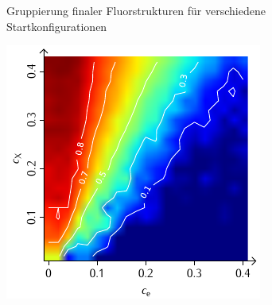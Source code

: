 \documentclass[a4paper, 10pt, twoside, openany]{book} %
\begin{document}
\begin{figure}
\begin{minipage}[t]{0.48\textwidth}
        \label{F_penalty_individual_G}
    \end{minipage}
    \caption[Gruppierung finaler Fluorstrukturen]{Gruppierung finaler Fluorstrukturen für verschiedene Startkonfigurationen}
    \label{F_G}
\end{figure}

\begin{figure}
    \begin{minipage}[t]{0.48\textwidth}
        \includegraphics[width=\textwidth]{Abbildungen/Phasendiagramme/Konturen/F_cluster_K.pdf}
        \label{F_cluster_K}
    \end{minipage}
    \hfill
    \begin{minipage}[t]{0.48\textwidth}

\end{minipage}
\end{figure}
\end{document}
